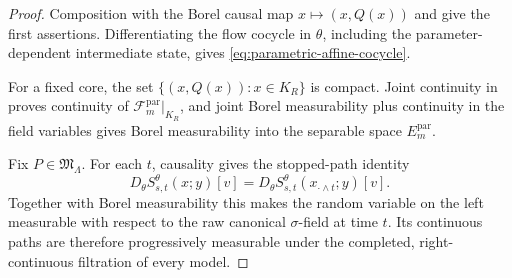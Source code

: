\documentclass[11pt,reqno]{amsart}
\theoremstyle{plain}
\theoremstyle{definition}
\begin{document}
\begin{proof}
Composition with the Borel causal map \(x\mapsto(x,Q(x))\) and
 give the first assertions.  Differentiating
the flow cocycle in \(\theta\), including the parameter-dependent
intermediate state, gives \eqref{eq:parametric-affine-cocycle}.

For a fixed core, the set
\(\{(x,Q(x)):x\in K_R\}\) is compact.  Joint continuity in
 proves continuity of
\(\mathscr F_m^{\mathrm{par}}|_{K_R}\), and joint Borel measurability plus
continuity in the field variables gives Borel measurability into the
separable space \(E_m^{\mathrm{par}}\).

Fix \(P\in\mathfrak M_\Lambda\).  For each \(t\), causality gives the
stopped-path identity
\[
  D_\theta S_{s,t}^\theta(x;y)[v]
  =D_\theta S_{s,t}^\theta(x_{\cdot\wedge t};y)[v].
\]
Together with Borel measurability this makes the random variable on the
left measurable with respect to the raw canonical \(\sigma\)-field at time
\(t\).  Its continuous paths are therefore progressively measurable under
the completed, right-continuous filtration of every model.


\end{proof}
\end{document}
